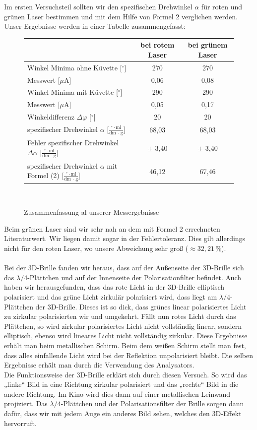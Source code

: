 \documentclass[fontsize=12pt]{scrartcl}
\begin{document}
Im ersten Versuchsteil sollten wir den spezifischen Drehwinkel $\alpha$ für roten und grünen Laser bestimmen und mit dem Hilfe von Formel 2 verglichen werden. Unser Ergebnisse werden in einer Tabelle zusammengefasst:
\begin{figure}[h]
\centering
\caption{Zusammenfassung al unserer Messergebnisse}
\begin{tabular}{|l|c|c|} \hline
 & bei rotem Laser  & bei grünem Laser\\ \hline
Winkel Minima ohne Küvette [$^\circ$]  & 270  & 270 \\ \hline
Messwert [$\mu$A]& 0,06 & 0,08  \\ \hline
Winkel Minima mit Küvette [$^\circ$] & 290  & 290 \\ \hline
Messwert [$\mu$A] & 0,05  & 0,17  \\ \hline 
Winkeldifferenz $\Delta\varphi$ [$^\circ$]& 20 & 20 \\ \hline 
spezifischer Drehwinkel $\alpha$ [$\frac{ ^\circ \cdot \text{ml}}{\text{dm $\cdot$ g}}$]  & 68,03  & 68,03  \\ \hline
Fehler spezifischer Drehwinkel  $\Delta \alpha$ [$\frac{ ^\circ \cdot \text{ml}}{\text{dm $\cdot$ g}}$]  & $\pm$ 3,40  & $\pm$ 3,40  \\ \hline
spezifischer Drehwinkel $\alpha$ mit Formel (2) [$\frac{ ^\circ \cdot \text{ml}}{\text{dm $\cdot$ g}}$]  & 46,12  & 67,46  \\ \hline
\end{tabular} \\
\end{figure}
\noindent
Beim grünen Laser sind wir sehr nah an dem mit Formel 2 errechneten Literaturwert. Wir liegen damit sogar in der Fehlertoleranz. Dies gilt allerdings nicht für 
den roten Laser, wo unsere Abweichung sehr groß ($\approx 32,21\,\%$).  \\
~\\
Bei der 3D-Brille fanden wir heraus, dass auf der Außenseite der 3D-Brille sich das $\lambda/4$-Plättchen und auf der Innenseite der Polarisationfilter 
befindet. Auch haben wir herausgefunden, dass das rote Licht in der 3D-Brille elliptisch polarisiert und das grüne Licht zirkulär polarisiert wird, dass liegt am 
$\lambda/4$-Plättchen der 3D-Brille. Dieses ist so dick, dass grünes linear polarisiertes Licht zu zirkular polarisierten wir und umgekehrt. Fällt nun rotes Licht durch das Plättchen, so wird zirkular polarisiertes Licht nicht vollständig linear, sondern elliptisch, ebenso wird lineares Licht nicht vollständig zirkular.
Diese Ergebnisse erhält man beim metallischen Schirm. Beim dem weißen Schirm stellt man fest,  dass alles einfallende Licht wird bei der Reflektion  unpolarisiert bleibt. Die selben Ergebnisse erhält man durch die Verwendung des Analysators.
~\\
Die Funktionsweise der 3D-Brille erklärt sich durch diesen Versuch. So wird das „linke“ Bild in eine Richtung zirkular polarisiert und das „rechte“ Bild in die andere Richtung. Im Kino wird dies dann auf einer metallischen Leinwand projiziert. Das $\lambda/4$-Plättchen und der Polarisationsfilter der Brille
sorgen dann dafür, dass wir mit jedem Auge ein anderes Bild sehen, welches den 3D-Effekt hervorruft.
\newpage
\end{document}
